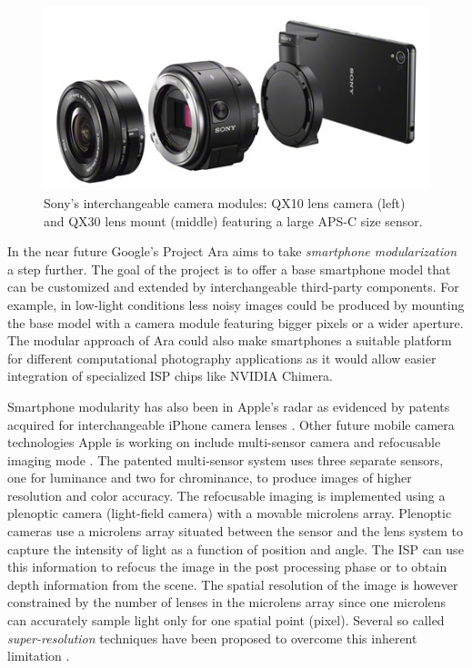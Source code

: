 \documentclass[thesis.tex]{subfiles}
\begin{document}
\begin{figure}[ht]
\centering \includegraphics[width=\textwidth]{images/sony_qx.jpg}
\caption{Sony's interchangeable camera modules: QX10 lens camera (left) and QX30 lens mount (middle) featuring a large APS-C size sensor.\label{figure:sony-qx}}
\end{figure}

In the near future Google's Project Ara aims to take \textit{smartphone modularization} a step further. The goal of the project is to offer a base smartphone model that can be customized and extended by interchangeable third-party components. For example, in low-light conditions less noisy images could be produced by mounting the base model with a camera module featuring bigger pixels or a wider aperture. The modular approach of Ara could also make smartphones a suitable platform for different computational photography applications as it would allow easier integration of specialized ISP chips like NVIDIA Chimera\texttrademark.

Smartphone modularity has also been in Apple's radar as evidenced by patents acquired for interchangeable iPhone camera lenses \cite{apple_patent_camera_module_3}\cite{apple_patent_camera_module_4}\cite{apple_patent_camera_module_5}. Other future mobile camera technologies Apple is working on include multi-sensor camera and refocusable imaging mode \cite{apple_patent_camera_module_1}\cite{apple_patent_camera_module_2}. The patented multi-sensor system uses three separate sensors, one for luminance and two for chrominance, to produce images of higher resolution and color accuracy. The refocusable imaging is implemented using a plenoptic camera (light-field camera) with a movable microlens array. Plenoptic cameras use a microlens array situated between the sensor and the lens system to capture the intensity of light as a function of position and angle. The ISP can use this information to refocus the image in the post processing phase or to obtain depth information from the scene. The spatial resolution of the image is however constrained by the number of lenses in the microlens array since one microlens can accurately sample light only for one spatial point (pixel). Several so called \textit{super-resolution} techniques have been proposed to overcome this inherent limitation \cite{plenoptic_1}\cite{plenoptic_2}\cite{plenoptic_3}.
\end{document}
